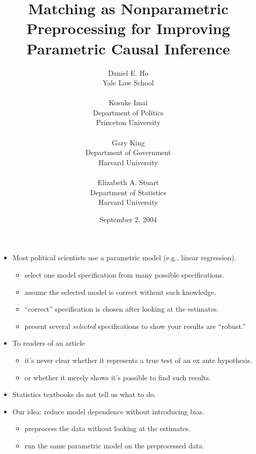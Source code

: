 \documentclass[20pt,landscape,pdftex]{foils}
\title{Matching as Nonparametric Preprocessing for Improving
  Parametric Causal Inference}
\date{September 2, 2004}
\author{Daniel E. Ho \\
  Yale Law School\\
  \\
  Kosuke Imai\\
  Department of Politics\\ Princeton University \\
  \\ 
  Gary King\\
  Department of Government\\ Harvard University\\
  \\
  Elizabeth A. Stuart\\
  Department of Statistics\\ Harvard University
\mbox{}\pdfbookmark{TitlePage}{stlab0}}
\begin{document}
\color{black}
\LOGOOFF
\maketitle



\hypersetup{pdfpagetransition=Replace}

\begin{itemize}
\item Most political scientists use a parametric model (e.g., linear
  regression).\pause
  \begin{itemize}
  \item select one model specification from many possible
    specifications.\pause
  \item assume the selected model is correct without such
    knowledge.\pause
  \item ``correct'' specification is chosen after looking at the
    estimates.\pause  
  \item present several {\it selected} specifications to show your
    results are ``robust.''\pause
  \end{itemize}

\item To readers of an article\pause 
  \begin{itemize}
  \item it's never clear whether it represents a true test of an ex
    ante hypothesis.\pause
  \item or whether it merely shows it's possible to find such
    results.\pause
  \end{itemize}
  
\item Statistics textbooks do not tell us what to do.\pause
  
\item Our idea: reduce model dependence without introducing
  bias.\pause
  \begin{itemize}
  \item preprocess the data without looking at the estimates.\pause
  \item run the same parametric model on the preprocessed data.\pause
  \end{itemize} 
\end{itemize}
\end{document}
